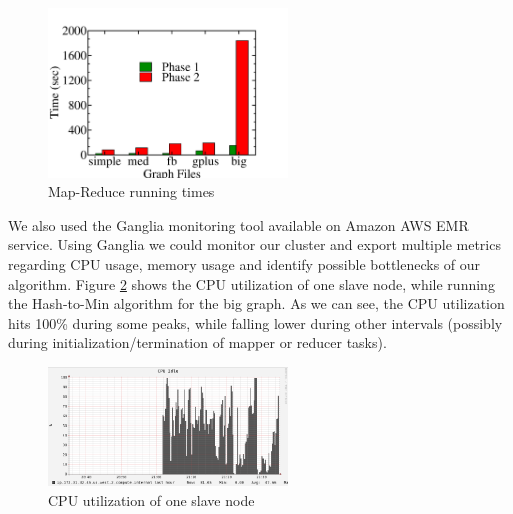 \begin{figure}[!h]
 \centering
    \includegraphics[width=15pc]{figures/mapreduce_graph}
	\caption{Map-Reduce running times}
    \label{fig:mapreduce_graph}
\end{figure}

We also used the Ganglia monitoring tool available on Amazon AWS EMR service. Using Ganglia we could monitor our cluster and export multiple metrics regarding CPU usage, memory usage and identify possible bottlenecks of our algorithm. Figure \ref{fig:cpu_usage} shows the CPU utilization of one slave node, while running the Hash-to-Min algorithm for the big graph. As we can see, the CPU utilization hits 100\% during some peaks, while falling lower during other intervals (possibly during initialization/termination of mapper or reducer tasks).

\begin{figure}[!h]
 \centering
    \includegraphics[width=15pc]{figures/cpu_usage}
	\caption{CPU utilization of one slave node}
    \label{fig:cpu_usage}
\end{figure}

